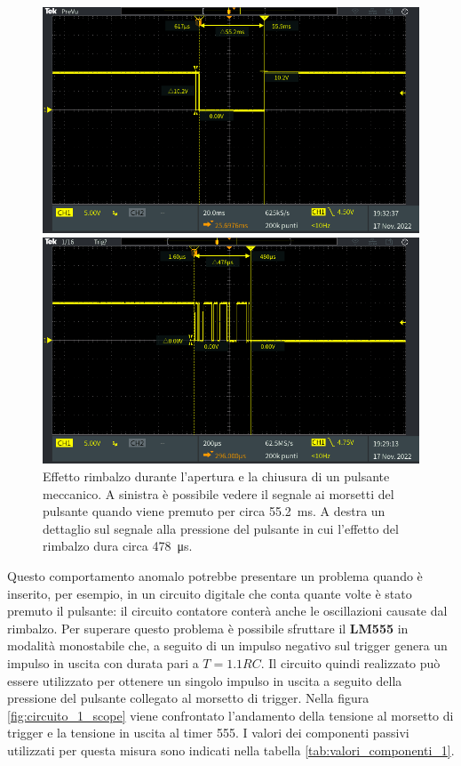 \begin{figure}[tbh]
	\centering
	\begin{minipage}{.496\textwidth}
		\includegraphics[width=\linewidth]{./ImageFiles/Laboratorio 5/TEK00003.PNG}
	\end{minipage}
	\begin{minipage}{.496\textwidth}
		\includegraphics[width=\linewidth]{./ImageFiles/Laboratorio 5/TEK00002.PNG}
	\end{minipage}
	\caption{Effetto rimbalzo durante l'apertura e la chiusura di un pulsante meccanico. A sinistra è possibile vedere il segnale ai morsetti del pulsante quando viene premuto per circa \SI{55.2}{\milli\second}. A destra un dettaglio sul segnale alla pressione del pulsante in cui l'effetto del rimbalzo dura circa \SI{478}{\micro\second}.}
	\label{fig:switch_bouncing}
\end{figure}
Questo comportamento anomalo potrebbe presentare un problema quando è inserito, per esempio, in un circuito digitale che conta quante volte è stato premuto il pulsante: il circuito contatore conterà anche le oscillazioni causate dal rimbalzo. Per superare questo problema è possibile sfruttare il \textbf{LM555} in modalità monostabile che, a seguito di un impulso negativo sul trigger genera un impulso in uscita con durata pari a $T=1.1RC$. Il circuito quindi realizzato può essere utilizzato per ottenere un singolo impulso in uscita a seguito della pressione del pulsante collegato al morsetto di trigger. Nella figura \ref{fig:circuito_1_scope} viene confrontato l'andamento della tensione al morsetto di trigger e la tensione in uscita al timer 555. I valori dei componenti passivi utilizzati per questa misura sono indicati nella tabella \ref{tab:valori_componenti_1}.

